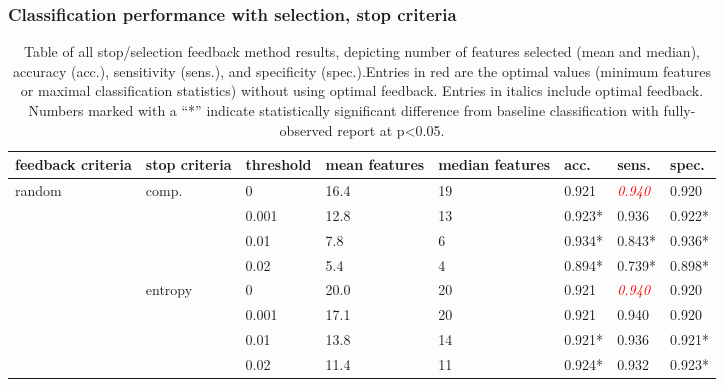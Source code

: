 \subsubsection{Classification performance with selection, stop criteria}
\begin{table}[h]
	\centering
	\caption[Feedback system performance]{Table of all stop/selection feedback method results, depicting number of features selected (mean and median), accuracy (acc.), sensitivity (sens.), and specificity (spec.).Entries in red are the optimal values (minimum features or maximal classification statistics) without using optimal feedback. Entries in italics include optimal feedback. Numbers marked with a ``*'' indicate statistically significant difference from baseline classification with fully-observed report at p<0.05.}
	\label{table:feedback_perf}
	\begin{tabularx}{\textwidth}{|X|X|X|X|X|X|X|X|}
		\hline
		feedback criteria        & stop criteria            & threshold & mean features & median features  & acc.           & sens.                & spec.          \\ \hline
		\multirow{8}{*}{random}  & \multirow{4}{*}{comp.}   & 0         & 16.4          & 19               & 0.921          & \textcolor{red}{\textit{0.940}}      & 0.920          \\ \cline{3-8} 
		&                          & 0.001     & 12.8          & 13               & 0.923*          & 0.936                & 0.922*          \\ \cline{3-8} 
		&                          & 0.01      & 7.8           & 6                & 0.934*          & 0.843*                & 0.936*          \\ \cline{3-8} 
		&                          & 0.02      & 5.4           & 4                & 0.894*          & 0.739*                & 0.898*          \\ \cline{2-8} 
		& \multirow{4}{*}{entropy} & 0         & 20.0          & 20               & 0.921          & \textcolor{red}{\textit{0.940}}       & 0.920          \\ \cline{3-8} 
		&                          & 0.001     & 17.1          & 20               & 0.921          & 0.940                & 0.920          \\ \cline{3-8} 
		&                          & 0.01      & 13.8          & 14               & 0.921*          & 0.936                & 0.921*          \\ \cline{3-8} 
		&                          & 0.02      & 11.4          & 11               & 0.924*          & 0.932                & 0.923*          \\ \hline

\end{tabularx}
\end{table}

